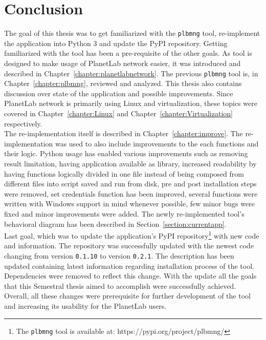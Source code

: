 \chapter{Conclusion}
The goal of this thesis was to get familiarized with the \texttt{plbmng} tool, re-implement the application into Python 3 and update the PyPI repository. Getting familiarized with the tool has been a pre-requisite of the other goals. As tool is designed to make usage of PlanetLab network easier, it was introduced and described in Chapter~\ref{chapter:planetlabnetwork}. The previous \texttt{plbmng} tool is, in Chapter~\ref{chapter:plbmng}, reviewed and analyzed. This thesis also contains discussion over state of the application and possible improvements. Since PlanetLab network is primarily using Linux and virtualization, these topics were covered in Chapter~\ref{chapter:Linux} and Chapter~\ref{chapter:Virtualization} respectively.\\
The re-implementation itself is described in Chapter~\ref{chapter:improve}. The re-implementation was used to also include improvements to the each functions and their logic. Python usage has enabled various improvements such as removing result limitation, having application available as library, increased readability by having functions logically divided in one file instead of being composed from different files into script saved and run from disk, pre and post installation steps were removed, set credentials function has been improved, several functions were written with Windows support in mind whenever possible, few minor bugs were fixed and minor improvements were added. The newly re-implemented tool's behavioral diagram has been described in Section~\ref{section:currentapp}.\\
Last goal, which was to update the application's PyPI repository\footnote{The \texttt{plbmng} tool is available at: https://pypi.org/project/plbmng/} with new code and information. The repository was successfully updated with the newest code changing from version \texttt{0.1.10} to version \texttt{0.2.1}. The description has been updated containing latest information regarding installation process of the tool. Dependencies were removed to reflect this change. With the update all the goals that this Semestral thesis aimed to accomplish were successfully achieved. Overall, all these changes were prerequisite for further development of the tool and increasing its usability for the PlanetLab users.
